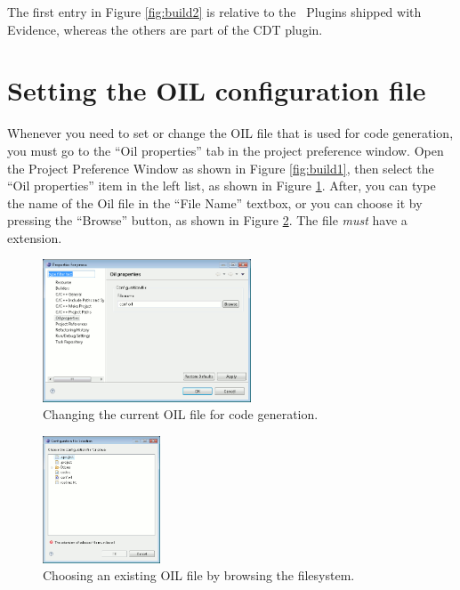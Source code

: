 The first entry in Figure \ref{fig:build2} is relative to the \rtd\ 
Plugins shipped with Evidence, whereas the others are part of the CDT
\cite{Eclipse-CDT} plugin.




\section{Setting the OIL configuration file}

Whenever you need to set or change the OIL file that is used for code
generation, you must go to the ``Oil properties'' tab in the project
preference window. Open the Project Preference Window as shown in
Figure \ref{fig:build1}, then select the ``Oil properties'' item in
the left list, as shown in Figure \ref{fig:conf1}. After, you can type
the name of the Oil file in the ``File Name'' textbox, or you can
choose it by pressing the ``Browse'' button, as shown in Figure
\ref{fig:conf2}. The file {\em must} have a  extension.

\begin{figure}
  \begin{center}
    \includegraphics[width=6.2cm, bb=0 0 635 434]{images/conf1.png}
  \end{center}
  \caption{Changing the current OIL file for code generation.}
  \label{fig:conf1}
\end{figure}

\begin{figure}
  \begin{center}
    \includegraphics[width=3.5cm, bb=0 0 419 453]{images/conf2.png}
  \end{center}
  \caption{Choosing an existing OIL file by browsing the filesystem.}
  \label{fig:conf2}
\end{figure}





